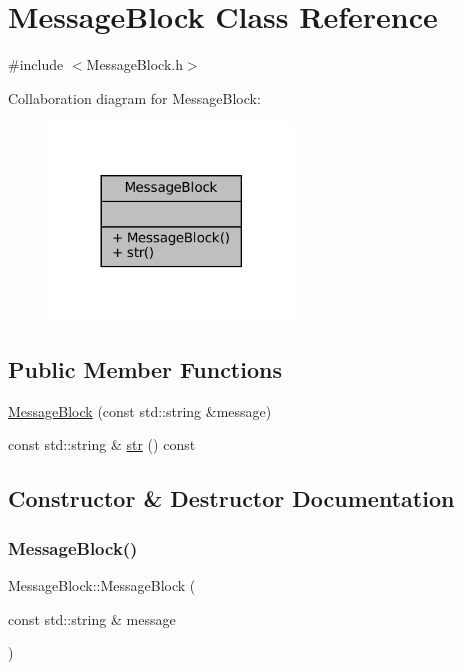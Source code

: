 \hypertarget{class_message_block}{}\section{Message\+Block Class Reference}
\label{class_message_block}


{\ttfamily \#include $<$Message\+Block.\+h$>$}



Collaboration diagram for Message\+Block\+:
\nopagebreak
\begin{figure}[H]
\begin{center}
\leavevmode
\includegraphics[width=185pt]{class_message_block__coll__graph}
\end{center}
\end{figure}
\subsection*{Public Member Functions}
\begin{DoxyCompactItemize}
\item 
\mbox{\hyperlink{class_message_block_a9f6e52ed74d37fc9025711f19750581f}{Message\+Block}} (const std\+::string \&message)
\item 
const std\+::string \& \mbox{\hyperlink{class_message_block_a87fc8364f0ddfd1b0b56049c4f13fc5d}{str}} () const
\end{DoxyCompactItemize}


\subsection{Constructor \& Destructor Documentation}
\mbox{\label{class_message_block_a9f6e52ed74d37fc9025711f19750581f}} 
\subsubsection{\texorpdfstring{Message\+Block()}{MessageBlock()}}
{\footnotesize\ttfamily Message\+Block\+::\+Message\+Block (\begin{DoxyParamCaption}\item[{const std\+::string \&}]{message }\end{DoxyParamCaption})\hspace{0.3cm}{\ttfamily [explicit]}}



